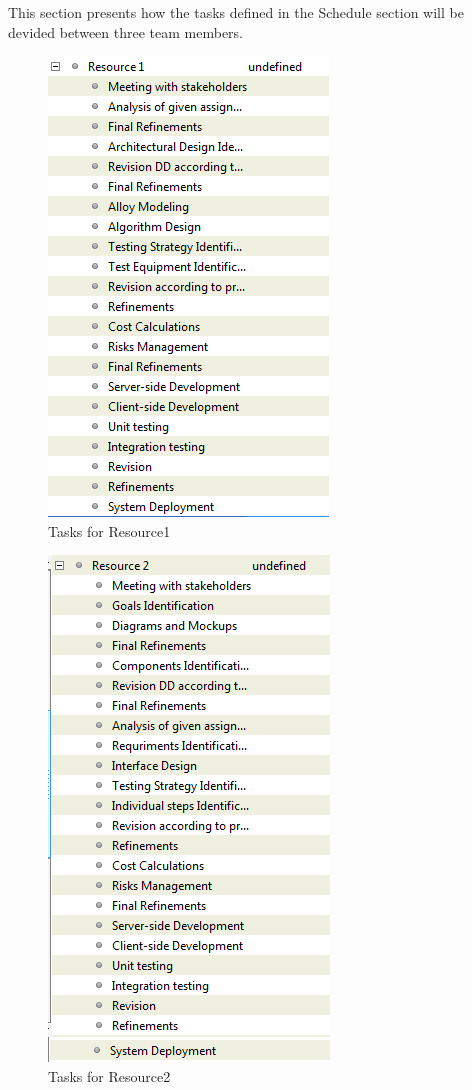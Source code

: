 This section presents how the tasks defined in the Schedule section will be devided between three team members.
	\begin{figure}[h]
		\includegraphics[scale=0.55]{img/Resource1.png}
		\caption{Tasks for Resource1}
	\end{figure}
	\newpage
	\begin{figure}[h]
		\includegraphics[scale=0.55]{img/Resource2.png}
		\caption{Tasks for Resource2}
	\end{figure}
